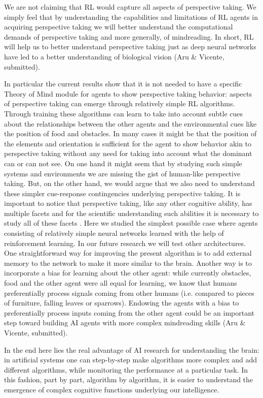 \documentclass{article}
\begin{document}
We are not claiming that RL would capture all aspects of perspective taking. We simply feel that by understanding the capabilities and limitations of RL agents in acquiring perspective taking we will better understand the computational demands of perspective taking and more generally, of mindreading. In short, RL will help us to better understand perspective taking just as deep neural networks have led to a better understanding of biological vision (Aru \& Vicente, submitted).

In particular the current results show that it is not needed to have a specific Theory of Mind module for agents to show perspective taking behavior: aspects of perspective taking can emerge through relatively simple RL algorithms. Through training these algorithms can learn to take into account subtle cues about the relationships between the other agents and the environmental cues like the position of food and obstacles. In many cases it might be that the position of the elements and orientation is sufficient for the agent to show behavior akin to perspective taking without any need for taking into account what the dominant can or can not see. On one hand it might seem that by studying such simple systems and environments we are missing the gist of human-like perspective taking. But, on the other hand, we would argue that we also need to understand these simpler cue-response contingencies underlying perspective taking. It is important to notice that perspective taking, like any other cognitive ability, has multiple facets and for the scientific understanding such abilities it is necessary to study all of these facets \cite{apperly2011mindreaders}. Here we studied the simplest possible case where agents consisting of relatively simple neural networks learned with the help of reinforcement learning. In our future research we will test other architectures. One straightforward way for improving the present algorithm is to add external memory to the network to make it more similar to the brain. Another way is to incorporate a bias for learning about the other agent: while currently obstacles, food and the other agent were all equal for learning, we know that humans preferentially process signals coming from other humans (i.e. compared to pieces of furniture, falling leaves or sparrows). Endowing the agents with a bias to preferentially process inputs coming from the other agent could be an important step toward building AI agents with more complex mindreading skills (Aru \& Vicente, submitted).

In the end here lies the real advantage of AI research for understanding the brain: in artificial systems one can step-by-step make algorithms more complex and add different algorithms, while monitoring the performance at a particular task. In this fashion, part by part, algorithm by algorithm, it is easier to understand the emergence of complex cognitive functions underlying our intelligence.


\appendix
\end{document}

